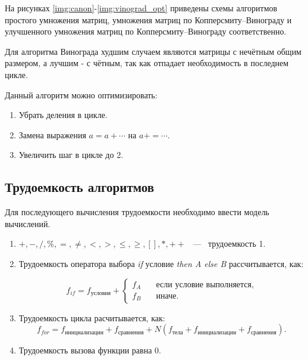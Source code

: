 На рисунках \ref{img:canon}-\ref{img:vinograd_opt} приведены схемы алгоритмов простого умножения матриц, умножения матриц по Копперсмиту–Винограду и улучшенного умножения матриц по Копперсмиту–Винограду соответственно.

Для алгоритма Винограда худшим случаем являются матрицы с нечётным общим размером, а лучшим - с чётным, так как отпадает необходимость в последнем цикле.

Данный алгоритм можно оптимизировать:

\begin{enumerate}
    \item Убрать деления в цикле.
    \item Замена выражения $a = a + \cdots $ на $a += \cdots$.
    \item Увеличить шаг в цикле до 2.
\end{enumerate}

\subsection{Трудоемкость алгоритмов}

Для последующего вычисления трудоемкости необходимо ввести модель вычислений.

\begin{enumerate}
    \item $+, -, /, \%, =, \neq, <, >, \leq, \geq, [ ], *, ++$ ~---~ трудоемкость 1.
    \item Трудоемкость оператора выбора \textit{if} условие \textit{then A else B} рассчитывается, как:

    \begin{equation}
        f_{if} = f_{\text{условия}} + \begin{cases}
                                f_A & \quad \text{если условие выполняется,} \\
                                f_B & \quad \text{иначе}.
                                \end{cases}
    \end{equation}

    \item Трудоемкость цикла расчитывается, как:
    \begin{equation}
        f_{for} = f_{\text{инициализации}} + f_{\text{сравнения}} + N(f_{\text{тела}} + f_{\text{инициализации}} + f_{\text{сравнения}}).
    \end{equation}

    \item Трудоемкость вызова функции равна 0.
\end{enumerate}

